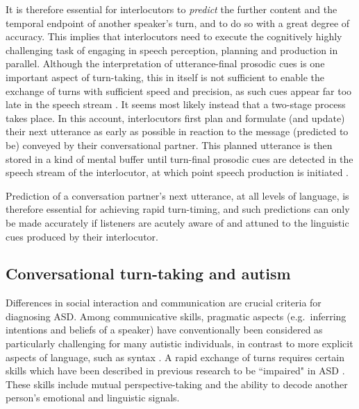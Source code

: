It is therefore essential for interlocutors to \emph{predict} the further content and the temporal endpoint of another speaker's turn, and to do so with a great degree of accuracy. This implies that interlocutors need to execute the cognitively highly challenging task of engaging in speech perception, planning and production in parallel. Although the interpretation of utterance-final prosodic cues is one important aspect of turn-taking, this in itself is not sufficient to enable the exchange of turns with sufficient speed and precision, as such cues appear far too late in the speech stream \citep{bogelsListenersUseIntonational2015,deruiterProjectingEndSpeaker2006,torreiraVocalReactionTimes2022}. It seems most likely instead that a two-stage process takes place. In this account, interlocutors first plan and formulate (and update) their next utterance as early as possible in reaction to the message (predicted to be) conveyed by their conversational partner. This planned utterance is then stored in a kind of mental buffer until turn-final prosodic cues are detected in the speech stream of the interlocutor, at which point speech production is initiated \citep{barthelNextSpeakersPlan2017,barthelTimingUtterancePlanning2016}.

Prediction of a conversation partner's next utterance, at all levels of language, is therefore essential for achieving rapid turn-timing, and such predictions can only be made accurately if listeners are acutely aware of and attuned to the linguistic cues produced by their interlocutor.

\subsection{Conversational turn-taking and autism}\label{turntaking_background_ASD}

Differences in social interaction and communication are crucial criteria for diagnosing ASD. Among communicative skills, pragmatic aspects (e.g.~inferring intentions and beliefs of a speaker) have conventionally been considered as particularly challenging for many autistic individuals, in contrast to more explicit aspects of language, such as syntax \citep{tager-flusbergLongitudinalStudyLanguage1990a, tager-flusbergLanguageCommunicationAutism2005a, eigstiPragmaticsMorphosyntacticDevelopment2007}. A rapid exchange of turns requires certain skills which have been described in previous research to be ``impaired" in ASD \citep{chassonSocialCompetenceImpairments2014}. These skills include mutual perspective-taking and the ability to decode another person's emotional and linguistic signals. 


